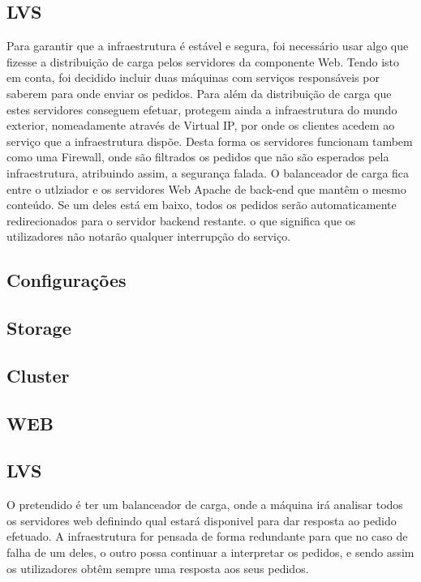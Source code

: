 \subsection{LVS}
Para garantir que a infraestrutura é estável e segura, foi necessário usar algo que fizesse a distribuição de carga pelos servidores da componente Web. Tendo isto em conta, foi decidido incluir duas máquinas com serviços responsáveis por saberem para onde enviar os pedidos. Para além da distribuição de carga que estes servidores conseguem efetuar, protegem ainda a infraestrutura do mundo exterior, nomeadamente através de Virtual IP, por onde os clientes acedem ao serviço que a infraestrutura dispõe. Desta forma os servidores funcionam tambem como uma Firewall, onde são filtrados os pedidos que não são esperados pela infraestrutura, atribuindo assim, a segurança falada.
O balanceador de carga fica entre o utlziador e os servidores Web Apache de back-end que mantêm o mesmo conteúdo. Se um deles está em baixo, todos os pedidos serão automaticamente redirecionados para o servidor backend restante. o que significa que os utilizadores não notarão qualquer interrupção do serviço.

\subsection{Configurações}

\subsection{Storage}

\subsection{Cluster}

\subsection{WEB}

\subsection{LVS}
O pretendido é ter um balanceador de carga, onde a máquina irá analisar todos os servidores web definindo qual estará disponivel para dar resposta ao pedido efetuado.
A infraestrutura for pensada de forma redundante para que no caso de falha de um deles, o outro possa continuar a interpretar os pedidos, e sendo assim os utilizadores obtêm sempre uma resposta aos seus pedidos.

